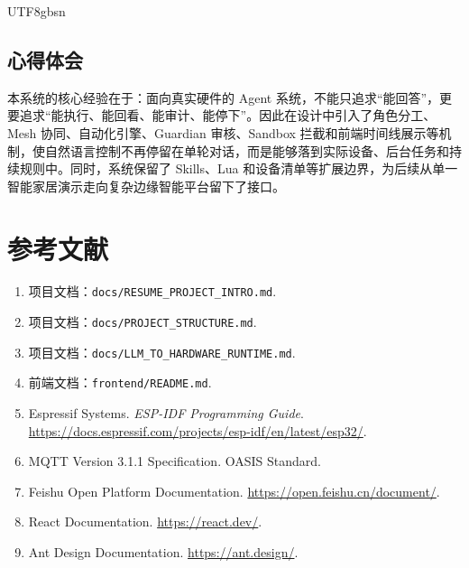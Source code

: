 \documentclass[a4paper,12pt]{article}
\begin{document}
\begin{CJK*}{UTF8}{gbsn}
\subsection{心得体会}
本系统的核心经验在于：面向真实硬件的 Agent 系统，不能只追求“能回答”，更要追求“能执行、能回看、能审计、能停下”。因此在设计中引入了角色分工、Mesh 协同、自动化引擎、Guardian 审核、Sandbox 拦截和前端时间线展示等机制，使自然语言控制不再停留在单轮对话，而是能够落到实际设备、后台任务和持续规则中。同时，系统保留了 Skills、Lua 和设备清单等扩展边界，为后续从单一智能家居演示走向复杂边缘智能平台留下了接口。

\section{参考文献}
\begin{enumerate}
  \item 项目文档：\texttt{docs/RESUME\_PROJECT\_INTRO.md}.
  \item 项目文档：\texttt{docs/PROJECT\_STRUCTURE.md}.
  \item 项目文档：\texttt{docs/LLM\_TO\_HARDWARE\_RUNTIME.md}.
  \item 前端文档：\texttt{frontend/README.md}.
  \item Espressif Systems. \textit{ESP-IDF Programming Guide}. \url{https://docs.espressif.com/projects/esp-idf/en/latest/esp32/}.
  \item MQTT Version 3.1.1 Specification. OASIS Standard.
  \item Feishu Open Platform Documentation. \url{https://open.feishu.cn/document/}.
  \item React Documentation. \url{https://react.dev/}.
  \item Ant Design Documentation. \url{https://ant.design/}.
\end{enumerate}

\end{CJK*}
\end{document}
